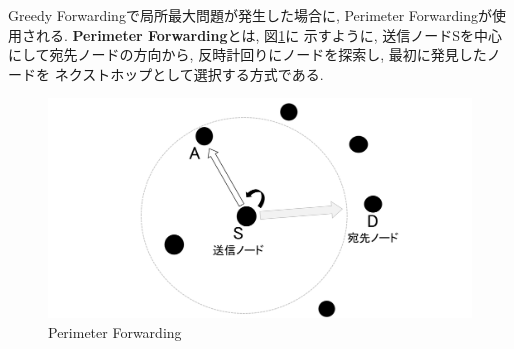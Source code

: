 \indent Greedy Forwardingで局所最大問題が発生した場合に, 
Perimeter Forwardingが使用される. 
\textbf{Perimeter Forwarding}とは, 図\ref{fig:perimeter}に
示すように, 送信ノードSを中心にして宛先ノードの方向から,  
反時計回りにノードを探索し, 最初に発見したノードを
ネクストホップとして選択する方式である.

\begin{figure}
  \centering
  \includegraphics[scale=0.55]{figures/perimeter.png}
  \caption{Perimeter Forwarding\cite{shinato}}
  \label{fig:perimeter}
\end{figure}